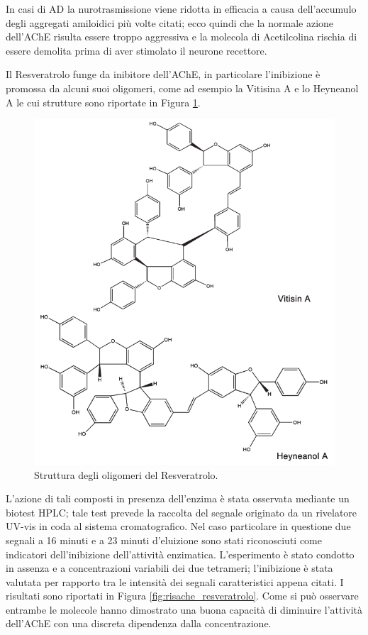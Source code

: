 \documentclass[a4paper, 12pt]{article}
\begin{document}
In casi di AD la nurotrasmissione viene ridotta in efficacia a causa dell'accumulo degli aggregati amiloidici più volte citati; ecco quindi che la normale azione dell'AChE risulta essere troppo aggressiva e la molecola di Acetilcolina rischia di essere demolita prima di aver stimolato il neurone recettore.

Il Resveratrolo funge da inibitore dell'AChE, in particolare l'inibizione è promossa da alcuni suoi oligomeri, come ad esempio la Vitisina A e lo Heyneanol A le cui strutture sono riportate in Figura \ref{fig:oly_resveratrolo}.

\begin{figure}[H]
	\centering
	\includegraphics[width=\linewidth]{immagini/oly_resveratrolo.png}
	\caption{Struttura degli oligomeri del Resveratrolo.}
	\label{fig:oly_resveratrolo}
\end{figure}

L'azione di tali composti in presenza dell'enzima è stata osservata mediante un biotest HPLC; tale test prevede la raccolta del segnale originato da un rivelatore UV-vis in coda al sistema cromatografico. Nel caso particolare in questione due segnali a 16 minuti e a 23 minuti d'eluizione sono stati riconosciuti come indicatori dell'inibizione dell'attività enzimatica. L'esperimento è stato condotto in assenza e a concentrazioni variabili dei due tetrameri; l'inibizione è stata valutata per rapporto tra le intensità dei segnali caratteristici appena citati.  I risultati sono riportati in Figura \ref{fig:risache_resveratrolo}. Come si può osservare entrambe le molecole hanno dimostrato una buona capacità di diminuire l'attività dell'AChE con una discreta dipendenza dalla concentrazione.
\end{document}
